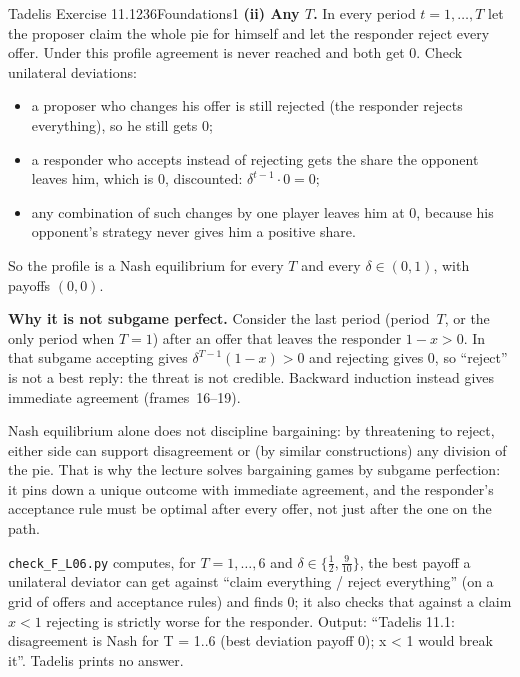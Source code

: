 \begin{exsol}{Tadelis Exercise 11.1}{236}{Foundations}{1}
\textbf{(ii) Any $T$.} In every period $t = 1, \dots, T$ let the proposer claim the whole pie for
himself and let the responder reject every offer. Under this profile agreement is never reached and
both get $0$. Check unilateral deviations:
\begin{itemize}
  \item a proposer who changes his offer is still rejected (the responder rejects everything), so he
  still gets $0$;
  \item a responder who accepts instead of rejecting gets the share the opponent leaves him, which is
  $0$, discounted: $\delta^{t-1}\cdot 0 = 0$;
  \item any combination of such changes by one player leaves him at $0$, because his opponent's
  strategy never gives him a positive share.
\end{itemize}
So the profile is a Nash equilibrium for every $T$ and every $\delta \in (0,1)$, with payoffs $(0,0)$.

\textbf{Why it is not subgame perfect.} Consider the last period (period~$T$, or the only period
when $T = 1$) after an offer that leaves the responder $1 - x > 0$. In that subgame accepting gives
$\delta^{T-1}(1-x) > 0$ and rejecting gives $0$, so ``reject'' is not a best reply: the threat is not
credible. Backward induction instead gives immediate agreement (frames~16--19).

\interp Nash equilibrium alone does not discipline bargaining: by threatening to reject, either side
can support disagreement or (by similar constructions) any division of the pie. That is why
the lecture solves bargaining games by subgame perfection: it pins down a unique outcome with
immediate agreement, and the responder's acceptance rule must be optimal after every offer, not just
after the one on the path.

\verify \texttt{check\_F\_L06.py} computes, for $T = 1,\dots,6$ and $\delta \in \{\frac12,
\frac9{10}\}$, the best payoff a unilateral deviator can get against ``claim everything / reject
everything'' (on a grid of offers and acceptance rules) and finds $0$; it also checks that against a
claim $x < 1$ rejecting is strictly worse for the responder. Output: ``Tadelis 11.1: disagreement is
Nash for T = 1..6 (best deviation payoff 0); x < 1 would break it''. Tadelis prints no answer.


\end{exsol}
